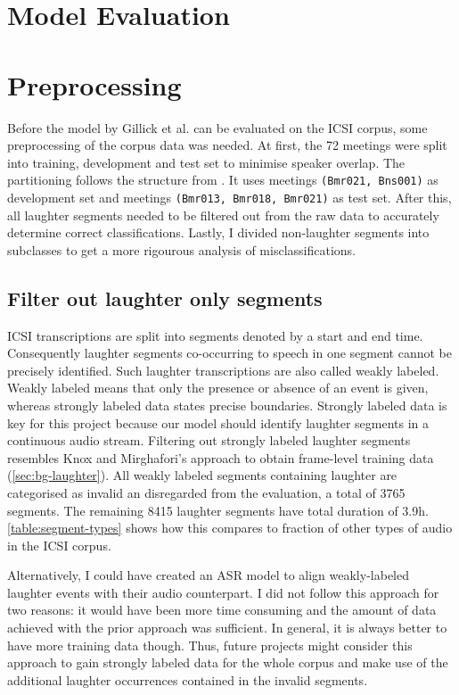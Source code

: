 \documentclass[bsc,frontabs,parskip,deptreport]{infthesis}
\begin{document}
\section{Model Evaluation} \label{sec:model-eval}
\section{Preprocessing} \label{sec:preprocessing}
Before the model by Gillick et al. can be evaluated on the ICSI corpus, some preprocessing of the corpus data was needed.
At first, the 72 meetings were split into training, development and test set to minimise speaker overlap. The partitioning follows the structure from \citeauthor{renals2014neural}. It uses meetings \texttt{(Bmr021, Bns001)} as development set and meetings \texttt{(Bmr013, Bmr018, Bmr021)} as test set.
After this, all laughter segments needed to be filtered out from the raw data to accurately determine correct classifications. 
Lastly, I divided non-laughter segments into subclasses to get a more rigourous analysis of misclassifications.

\subsection{Filter out laughter only segments} \label{subsec:filter-laughter}
ICSI transcriptions are split into segments denoted by a start and end time.
Consequently laughter segments co-occurring to speech in one segment cannot be precisely identified.
Such laughter transcriptions are also called weakly labeled. Weakly labeled means that only the presence or absence of an event is given, whereas strongly labeled data states precise boundaries.
Strongly labeled data is key for this project because our model should identify laughter segments in a continuous audio stream.
Filtering out strongly labeled laughter segments resembles Knox and Mirghafori's approach to obtain frame-level training data \citep{knox2006automatic} (\autoref{sec:bg-laughter}). 
All weakly labeled segments containing laughter are categorised as invalid an disregarded from the evaluation, a total of 3765 segments.
The remaining 8415 laughter segments have total duration of 3.9h. \autoref{table:segment-types} shows how this compares to fraction of other types of audio in the ICSI corpus.

Alternatively, I could have created an ASR model to align weakly-labeled laughter events with their audio counterpart. 
I did not follow this approach for two reasons: it would have been more time consuming and the amount of data achieved with the prior approach was sufficient. 
In general, it is always better to have more training data though. Thus, future projects might consider this approach to gain strongly labeled data for the whole corpus and make use of the additional laughter occurrences contained in the invalid segments. 
\end{document}
